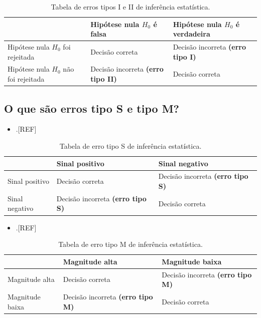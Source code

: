 \documentclass[
  a4paper,
]{book}
\providecommand{\tightlist}{%
  \setlength{\itemsep}{0pt}\setlength{\parskip}{0pt}}
\begin{document}
\begin{table}

\caption{\label{tab:erros-inferencia-I-II}Tabela de erros tipos I e II de inferência estatística.}
\centering
\begin{tabu} to 
\toprule
  & Hipótese nula $H_{0}$ 
 é falsa & Hipótese nula $H_{0}$ 
\textbf{ é verdadeira}\\
\midrule
Hipótese nula $H_{0}$ 
 foi rejeitada & Decisão correta & Decisão incorreta 
\textbf{ (erro tipo I)}\\
Hipótese nula $H_{0}$ 
 não foi rejeitada & Decisão incorreta 
\textbf{ (erro tipo II)} & Decisão correta\\
\bottomrule
\end{tabu}
\end{table}

\hypertarget{o-que-suxe3o-erros-tipo-s-e-tipo-m}{%
\subsection{O que são erros tipo S e tipo M?}\label{o-que-suxe3o-erros-tipo-s-e-tipo-m}}

\begin{itemize}
\tightlist
\item
  .{[}REF{]}
\end{itemize}

\begin{table}

\caption{\label{tab:erros-inferencia-S}Tabela de erro tipo S de inferência estatística.}
\centering
\begin{tabu} to 
\toprule
\textbf{ } & \textbf{Sinal positivo} & \textbf{Sinal negativo}\\
\midrule
Sinal positivo & Decisão correta & Decisão incorreta 
\textbf{ (erro tipo S)}\\
Sinal negativo & Decisão incorreta 
\textbf{ (erro tipo S)} & Decisão correta\\
\bottomrule
\end{tabu}
\end{table}

\begin{itemize}
\tightlist
\item
  .{[}REF{]}
\end{itemize}

\begin{table}

\caption{\label{tab:erros-inferencia-M}Tabela de erro tipo M de inferência estatística.}
\centering
\begin{tabu} to 
\toprule
\textbf{ } & \textbf{Magnitude alta} & \textbf{Magnitude baixa}\\
\midrule
Magnitude alta & Decisão correta & Decisão incorreta 
\textbf{ (erro tipo M)}\\
Magnitude baixa & Decisão incorreta 
\textbf{ (erro tipo M)} & Decisão correta\\
\bottomrule
\end{tabu}
\end{table}
\end{document}
